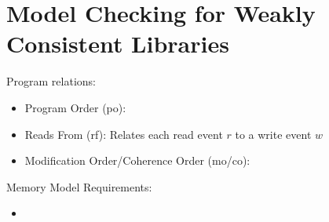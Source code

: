 \documentclass[12pt]{article}
\begin{document}
\section{Model Checking for Weakly Consistent Libraries}
Program relations:
\begin{itemize}
    \item Program Order (po):
    \item Reads From (rf): Relates each read event $r$ to a write event $w$
    \item Modification Order/Coherence Order (mo/co): 
\end{itemize}

Memory Model Requirements:
\begin{itemize}
    \item 
\end{itemize}
\end{document}

